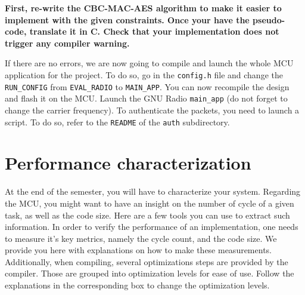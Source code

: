 \textbf{
    First, re-write the CBC-MAC-AES algorithm to make it easier to
    implement with the given constraints. Once your have the pseudo-code, translate it in C. Check that your implementation does not trigger any compiler warning.
}

If there are no errors, we are now going to compile and launch the whole MCU application for the project. To do so, go in the \texttt{config.h} file and change the \texttt{RUN\_CONFIG} from \texttt{EVAL\_RADIO} to \texttt{MAIN\_APP}. You can now recompile the design and flash it on the MCU. Launch the GNU Radio \texttt{main\_app} (do not forget to change the carrier frequency). To authenticate the packets, you need to launch a script. To do so, refer to the \texttt{README} of the \texttt{auth} subdirectory.

\section{Performance characterization}
At the end of the semester, you will have to characterize your system. Regarding the MCU, you might want to have an insight on the number of cycle of a given task, as well as the code size. Here are a few tools you can use to extract such information. In order to verify the performance of an implementation, one needs to measure it's key metrics, namely the cycle count, and the code size. We provide you here with explanations on how to make these measurements. Additionally, when compiling, several optimizations steps are provided by the compiler. Those are grouped into optimization levels for ease of use. Follow the explanations in the corresponding box to change the optimization levels. 



